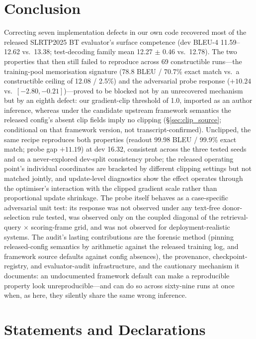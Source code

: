\documentclass[pdflatex,sn-chicago]{sn-jnl}
\begin{document}
\section{Conclusion}
Correcting seven implementation defects in our own code recovered most of the released SLRTP2025 BT evaluator's surface competence (dev BLEU-4 11.59--12.62 vs.\ 13.38; test-decoding family mean 12.27 $\pm$ 0.46 vs.\ 12.78). The two properties that then still failed to reproduce across 69 constructible runs---the training-pool memorisation signature (78.8 BLEU / 70.7\% exact match vs.\ a constructible ceiling of 12.08 / 2.5\%) and the adversarial probe response ($+10.24$ vs.\ $[-2.80,-0.21]$)---proved to be blocked not by an unrecovered mechanism but by an eighth defect: our gradient-clip threshold of 1.0, imported as an author inference, whereas under the candidate upstream framework semantics the released config's absent clip fields imply no clipping (\S\ref{sec:clip_source}; conditional on that framework version, not transcript-confirmed). Unclipped, the same recipe reproduces both properties (readout 99.98 BLEU / 99.9\% exact match; probe gap $+11.19$) at dev 16.32, consistent across the three tested seeds and on a never-explored dev-split consistency probe; the released operating point's individual coordinates are bracketed by different clipping settings but not matched jointly, and update-level diagnostics show the effect operates through the optimiser's interaction with the clipped gradient scale rather than proportional update shrinkage. The probe itself behaves as a case-specific adversarial unit test: its response was not observed under any text-free donor-selection rule tested, was observed only on the coupled diagonal of the retrieval-query $\times$ scoring-frame grid, and was not observed for deployment-realistic systems. The audit's lasting contributions are the forensic method (pinning released-config semantics by arithmetic against the released training log, and framework source defaults against config absences), the provenance, checkpoint-registry, and evaluator-audit infrastructure, and the cautionary mechanism it documents: an undocumented framework default can make a reproducible property look unreproducible---and can do so across sixty-nine runs at once when, as here, they silently share the same wrong inference.

\section*{Statements and Declarations}
\label{sec:ethics}
\end{document}
